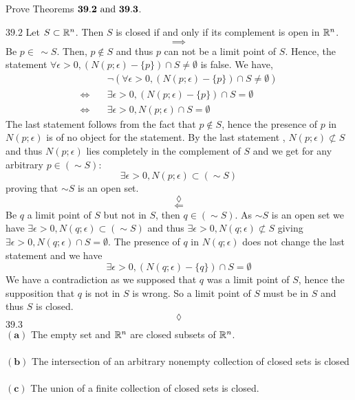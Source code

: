 \subsection{}
\begin{tcolorbox}
Prove Theorems $\mathbf{39.2}\text{ and } \mathbf{39.3}$.
\end{tcolorbox}
$$ $$
$\mathbf{39.2}$ Let $S\subset \mathbb{R}^n$. Then $S$ is closed if and only if its complement is open in $\mathbb{R}^n$.
$$\implies$$
Be $p\in \, \sim S$. Then, $p\not \in  S$ and thus $p$ can not be a limit point of $S$. Hence, the statement $\forall \epsilon >0,\left(N(p;\epsilon)-\{p\}\right)\cap S\neq \emptyset$ is false. We have,
\begin{align*}
&\neg\left(\forall \epsilon >0,\left(N(p;\epsilon)-\{p\}\right)\cap S\neq \emptyset\right)\\
\Leftrightarrow\quad &\exists \epsilon >0,\left(N(p;\epsilon)-\{p\}\right)\cap S= \emptyset\\
\Leftrightarrow\quad &\exists \epsilon >0,N(p;\epsilon)\cap S= \emptyset
\end{align*}
The last statement follows from the fact that $p\not\in S$, hence the presence of $p$ in $N(p;\epsilon)$ is of no object for the statement.
By the last statement , $N(p;\epsilon)\not\subset S$ and thus $N(p;\epsilon)$ lies completely in the complement of $S$ and we get for any arbitrary $p\in(\sim S)$:
$$\exists \epsilon >0,N(p;\epsilon)\subset (\sim S)$$
proving that $\sim S$ is an open set.
$$\lozenge$$
$$\Leftarrow$$
Be $q$ a limit point of $S$ but not in $S$, then $q\in(\sim S)$. As $\sim S$ is an open set we have $\exists\epsilon >0, N(q;\epsilon)\subset (\sim S)$ and thus $\exists\epsilon >0, N(q;\epsilon)\not \subset S$ giving $\exists\epsilon >0, N(q;\epsilon) \cap S=\emptyset$. The presence of $q$ in $N(q;\epsilon)$ does not change the last statement and we have
$$\exists\epsilon >0, \left(N(q;\epsilon)-\{q\}\right)\cap S=\emptyset$$
We have a contradiction as we supposed that $q$ was a limit point of $S$, hence the supposition that $q$ is not in $S$ is wrong. So a limit point of $S$ must be in $S$ and thus $S$ is closed.
$$\lozenge$$
$\mathbf{39.3}$\\ 
$\mathbf{(a)}$ The empty set and $\mathbb{R}^n$ are closed subsets of $\mathbb{R}^n$.\\\\
$\mathbf{(b)}$ The intersection of an arbitrary nonempty collection of closed sets is closed\\\\
$\mathbf{(c)}$ The union of a finite collection of closed sets is closed.


